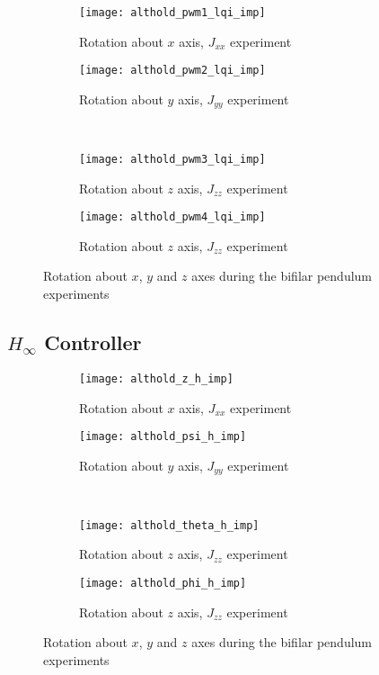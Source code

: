 \begin{appendices}
\begin{figure}[H]
\begin{subfigure}{.5\linewidth}
\centering
\texttt{[image: althold\_pwm1\_lqi\_imp]}
\caption{Rotation about $x$ axis, $J_{xx}$ experiment}
\label{fig:althold_pwm_lqi_imp}
\end{subfigure}%
\begin{subfigure}{.5\linewidth}
\centering
\texttt{[image: althold\_pwm2\_lqi\_imp]}
\caption{Rotation about $y$ axis, $J_{yy}$ experiment}
\label{fig:althold_pwm2_lqi_imp}
\end{subfigure}\\[1ex]
\begin{subfigure}{0.5\linewidth}
\centering
\texttt{[image: althold\_pwm3\_lqi\_imp]}
\caption{Rotation about $z$ axis, $J_{zz}$ experiment}
\label{fig:althold_pwm3_lqi_imp}
\end{subfigure}
\begin{subfigure}{0.5\linewidth}
\centering
\texttt{[image: althold\_pwm4\_lqi\_imp]}
\caption{Rotation about $z$ axis, $J_{zz}$ experiment}
\label{fig:althold_pwm4_lqi_imp}
\end{subfigure}
\caption{Rotation about $x$, $y$ and $z$ axes during the bifilar pendulum experiments}
\label{fig:althold_pwm_lqi}
\end{figure}

\subsection*{$H_\infty$ Controller}

\begin{figure}[H]
\begin{subfigure}{.5\linewidth}
\centering
\texttt{[image: althold\_z\_h\_imp]}
\caption{Rotation about $x$ axis, $J_{xx}$ experiment}
\label{fig:althold_z_h_imp}
\end{subfigure}%
\begin{subfigure}{.5\linewidth}
\centering
\texttt{[image: althold\_psi\_h\_imp]}
\caption{Rotation about $y$ axis, $J_{yy}$ experiment}
\label{fig:althold_psi_h_imp}
\end{subfigure}\\[1ex]
\begin{subfigure}{0.5\linewidth}
\centering
\texttt{[image: althold\_theta\_h\_imp]}
\caption{Rotation about $z$ axis, $J_{zz}$ experiment}
\label{fig:althold_theta_h_imp}
\end{subfigure}
\begin{subfigure}{0.5\linewidth}
\centering
\texttt{[image: althold\_phi\_h\_imp]}
\caption{Rotation about $z$ axis, $J_{zz}$ experiment}
\label{fig:althold_phi_h_imp}
\end{subfigure}
\caption{Rotation about $x$, $y$ and $z$ axes during the bifilar pendulum experiments}
\label{fig:althold_h_imp}
\end{figure}


\end{appendices}

